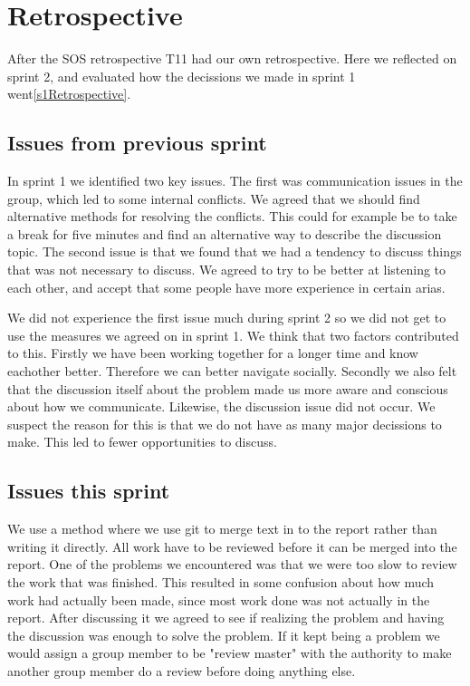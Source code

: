\section{Retrospective} \label{s2Retrospective}

After the SOS retrospective \gls{T11} had our own retrospective. Here we reflected on sprint 2, and evaluated how the decissions we made in sprint 1 went\autoref{s1Retrospective}.

\subsection{Issues from previous sprint}

In sprint 1 we identified two key issues. The first was communication issues in the group, which led to some internal conflicts. We agreed that we should find alternative methods for resolving the conflicts. This could for example be to take a break for five minutes and find an alternative way to describe the discussion topic. The second issue is that we found that we had a tendency to discuss things that was not necessary to discuss. We agreed to try to be better at listening to each other, and accept that some people have more experience in certain arias. 

We did not experience the first issue much during sprint 2 so we did not get to use the measures we agreed on in sprint 1. We think that two factors contributed to this. Firstly we have been working together for a longer time and know eachother better. Therefore we can better navigate socially. Secondly we also felt that the discussion itself about the problem made us more aware and conscious about how we communicate.
Likewise, the discussion issue did not occur. We suspect the reason for this is that we do not have as many major decissions to make. This led to fewer opportunities to discuss.

\subsection{Issues this sprint}
We use a method where we use git to merge text in to the report rather than writing it directly. All work have to be reviewed before it can be merged into the report. One of the problems we encountered was that we were too slow to review the work that was finished. This resulted in some confusion about how much work had actually been made, since most work done was not actually in the report. After discussing it we agreed to see if realizing the problem and having the discussion was enough to solve the problem. If it kept being a problem we would assign a group member to be "review master" with the authority to make another group member do a review before doing anything else. 

